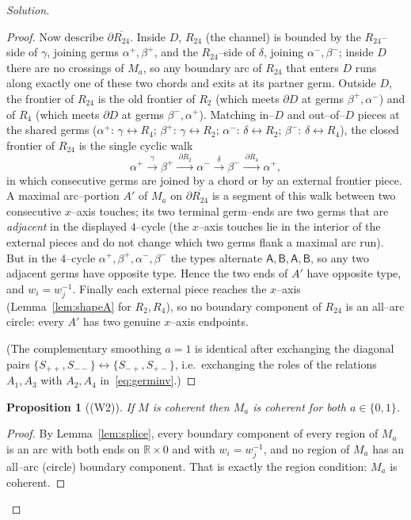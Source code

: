 \documentclass{amsart}
\newtheorem{proposition}{Proposition}
\theoremstyle{definition}
\newcommand{\RR}{\mathbb{R}}
\newcommand{\bdy}{\partial}
\begin{document}
\begin{proof}[Solution]
\begin{proof}
Now describe $\bdy\overline{R_{24}}$. Inside $D$, $R_{24}$ (the channel) is bounded by the
$R_{24}$--side of $\gamma$, joining germs $\alpha^+,\beta^+$, and the $R_{24}$--side of $\delta$,
joining $\alpha^-,\beta^-$; inside $D$ there are no crossings of $M_a$, so any boundary arc of
$R_{24}$ that enters $D$ runs along exactly one of these two chords and exits at its partner germ.
Outside $D$, the frontier of $R_{24}$ is the old frontier of $R_2$ (which meets $\bdy D$ at germs
$\beta^+,\alpha^-$) and of $R_4$ (which meets $\bdy D$ at germs $\beta^-,\alpha^+$). Matching
in--$D$ and out--of--$D$ pieces at the shared germs ($\alpha^+$: $\gamma\leftrightarrow R_4$;
$\beta^+$: $\gamma\leftrightarrow R_2$; $\alpha^-$: $\delta\leftrightarrow R_2$; $\beta^-$:
$\delta\leftrightarrow R_4$), the closed frontier of $R_{24}$ is the single cyclic walk
\[
  \alpha^+ \xrightarrow{\ \gamma\ } \beta^+ \xrightarrow{\ \bdy R_2\ } \alpha^-
          \xrightarrow{\ \delta\ } \beta^- \xrightarrow{\ \bdy R_4\ } \alpha^+ ,
\]
in which consecutive germs are joined by a chord or by an external frontier piece. A maximal
arc--portion $A'$ of $M_a$ on $\bdy\overline{R_{24}}$ is a segment of this walk between two
consecutive $x$--axis touches; its two terminal germ--ends are two germs that are \emph{adjacent}
in the displayed $4$--cycle (the $x$--axis touches lie in the interior of the external pieces and
do not change which two germs flank a maximal arc run). But in the $4$--cycle
$\alpha^+,\beta^+,\alpha^-,\beta^-$ the types alternate $\mathsf A,\mathsf B,\mathsf A,\mathsf B$,
so any two adjacent germs have opposite type. Hence the two ends of $A'$ have opposite type, and
$w_i=w_j^{-1}$. Finally each external piece reaches the $x$--axis (Lemma~\ref{lem:shapeA} for
$R_2,R_4$), so no boundary component of $R_{24}$ is an all--arc circle: every $A'$ has two genuine
$x$--axis endpoints.

(The complementary smoothing $a{=}1$ is identical after exchanging the diagonal pairs
$\{S_{++},S_{--}\}\leftrightarrow\{S_{-+},S_{+-}\}$, i.e.\ exchanging the roles of the relations
$A_1,A_3$ with $A_2,A_4$ in~\eqref{eq:germinv}.)
\end{proof}


\begin{proposition}[(W2)]\label{prop:W2}
If $M$ is coherent then $M_a$ is coherent for both $a\in\{0,1\}$.
\end{proposition}

\begin{proof}
By Lemma~\ref{lem:splice}, every boundary component of every region of $M_a$ is an arc with both
ends on $\RR\times0$ and with $w_i=w_j^{-1}$, and no region of $M_a$ has an all–arc (circle)
boundary component. That is exactly the region condition: $M_a$ is coherent.
\end{proof}


\end{proof}
\end{document}
